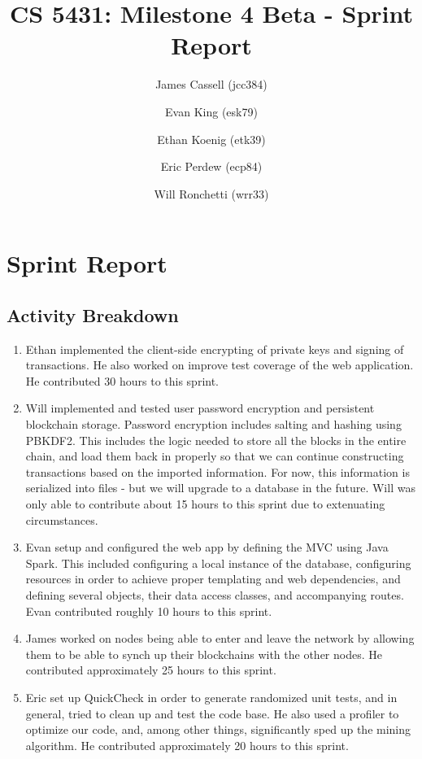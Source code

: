 \documentclass[a4paper,12pt]{article}
\title{CS 5431: Milestone 4 Beta - Sprint Report}
\author{
James Cassell (jcc384)
\and
Evan King (esk79)
\and
Ethan Koenig (etk39)
\and
Eric Perdew (ecp84)
\and
Will Ronchetti (wrr33)
}
\begin{document}
\maketitle

\section{Sprint Report}

\subsection{Activity Breakdown}

\begin{enumerate}
\item Ethan implemented the client-side encrypting of private keys and signing of transactions. He also worked on improve test coverage of the web application. He contributed 30 hours to this sprint.
\item Will implemented and tested user password encryption and persistent blockchain storage. Password encryption includes salting and hashing using PBKDF2. This includes the logic needed to store all the blocks in the entire chain, and load them back in properly so that we can continue constructing transactions based on the imported information. For now, this information is serialized into files - but we will upgrade to a database in the future. Will was only able to contribute about 15 hours to this sprint due to extenuating circumstances.
\item Evan setup and configured the web app by defining the MVC using Java Spark. This included configuring a local instance of the database, configuring resources in order to achieve proper templating and web dependencies, and defining several objects, their data access classes, and accompanying routes. Evan contributed roughly 10 hours to this sprint. %
\item James worked on nodes being able to enter and leave the network by allowing them to be able to synch up their blockchains with the other nodes.
He contributed approximately 25 hours to this sprint.
\item  Eric set up QuickCheck in order to generate randomized unit tests, and in general, tried to clean up and test the code base. He also used a profiler to optimize our code, and, among other things, significantly sped up the mining algorithm. He contributed approximately 20 hours to this sprint.
\end{enumerate}
\end{document}
